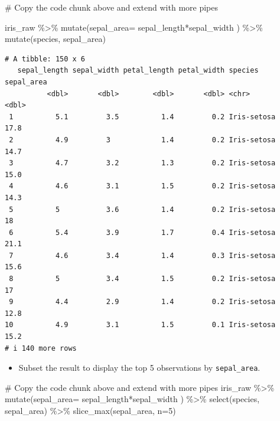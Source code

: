 \documentclass[
  letterpaper,
  DIV=11,
  numbers=noendperiod]{scrartcl}
\newenvironment{Shaded}{\begin{snugshade}}{\end{snugshade}}
\newcommand{\AttributeTok}[1]{\textcolor[rgb]{0.40,0.45,0.13}{#1}}
\newcommand{\CommentTok}[1]{\textcolor[rgb]{0.37,0.37,0.37}{#1}}
\newcommand{\DecValTok}[1]{\textcolor[rgb]{0.68,0.00,0.00}{#1}}
\newcommand{\FunctionTok}[1]{\textcolor[rgb]{0.28,0.35,0.67}{#1}}
\newcommand{\NormalTok}[1]{\textcolor[rgb]{0.00,0.23,0.31}{#1}}
\newcommand{\SpecialCharTok}[1]{\textcolor[rgb]{0.37,0.37,0.37}{#1}}
\providecommand{\tightlist}{%
  \setlength{\itemsep}{0pt}\setlength{\parskip}{0pt}}\usepackage{longtable,booktabs,array}
\begin{document}
\begin{Shaded}
\begin{Highlighting}[]
\CommentTok{\# Copy the code chunk above and extend with more pipes}

\NormalTok{iris\_raw }\SpecialCharTok{\%\textgreater{}\%}
  \FunctionTok{mutate}\NormalTok{(}\AttributeTok{sepal\_area=}\NormalTok{ sepal\_length}\SpecialCharTok{*}\NormalTok{sepal\_width ) }\SpecialCharTok{\%\textgreater{}\%} 
  \FunctionTok{mutate}\NormalTok{(species, sepal\_area)}
\end{Highlighting}
\end{Shaded}

\begin{verbatim}
# A tibble: 150 x 6
   sepal_length sepal_width petal_length petal_width species     sepal_area
          <dbl>       <dbl>        <dbl>       <dbl> <chr>            <dbl>
 1          5.1         3.5          1.4         0.2 Iris-setosa       17.8
 2          4.9         3            1.4         0.2 Iris-setosa       14.7
 3          4.7         3.2          1.3         0.2 Iris-setosa       15.0
 4          4.6         3.1          1.5         0.2 Iris-setosa       14.3
 5          5           3.6          1.4         0.2 Iris-setosa       18  
 6          5.4         3.9          1.7         0.4 Iris-setosa       21.1
 7          4.6         3.4          1.4         0.3 Iris-setosa       15.6
 8          5           3.4          1.5         0.2 Iris-setosa       17  
 9          4.4         2.9          1.4         0.2 Iris-setosa       12.8
10          4.9         3.1          1.5         0.1 Iris-setosa       15.2
# i 140 more rows
\end{verbatim}

\begin{itemize}
\tightlist
\item
  Subset the result to display the top 5 observations by
  \texttt{sepal\_area}.
\end{itemize}

\begin{Shaded}
\begin{Highlighting}[]
\CommentTok{\# Copy the code chunk above and extend with more pipes}
\NormalTok{iris\_raw }\SpecialCharTok{\%\textgreater{}\%}
  \FunctionTok{mutate}\NormalTok{(}\AttributeTok{sepal\_area=}\NormalTok{ sepal\_length}\SpecialCharTok{*}\NormalTok{sepal\_width ) }\SpecialCharTok{\%\textgreater{}\%} 
  \FunctionTok{select}\NormalTok{(species, sepal\_area) }\SpecialCharTok{\%\textgreater{}\%} 
  \FunctionTok{slice\_max}\NormalTok{(sepal\_area, }\AttributeTok{n=}\DecValTok{5}\NormalTok{)}
\end{Highlighting}
\end{Shaded}
\end{document}
